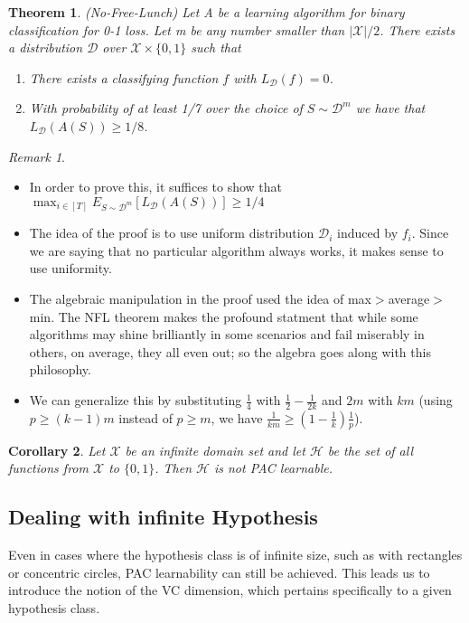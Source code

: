\documentclass{article}
\newtheorem{theorem}{Theorem}
\newtheorem{corollary}[theorem]{Corollary}
\theoremstyle{remark}
\newtheorem{remark}[example]{Remark}
\begin{document}
    \begin{theorem}
    (No-Free-Lunch) Let A be a learning algorithm for binary classification for 0-1 loss. Let m be any number smaller than $\lvert\mathcal{X}\vert/2$. There exists 
    a distribution $\mathcal{D}$ over $\mathcal{X}\times\{0,1\}$ such that 
    \begin{enumerate}
    \item There exists a classifying function $f$ with $L_\mathcal{D}(f)=0$.
    \item With probability of at least 1/7 over the choice of $S\sim \mathcal{D}^m$ we have that $L_{\mathcal{D}}(A(S))\geq 1/8$.
    \end{enumerate}
    \end{theorem}
    \begin{remark}
    \begin{itemize}
    \item In order to prove this, it suffices to show that $\max_{i\in[T]} E_{S\sim\mathcal{D}^m}[L_\mathcal{D}(A(S))]\geq 1/4$
    \item The idea of the proof is to use uniform distribution $\mathcal{D}_i$ induced by $f_i$. Since we are saying that no particular algorithm always works, it makes sense to use uniformity.
    \item The algebraic manipulation in the proof used the idea of max$>$average$>$min. The NFL theorem makes the profound
     statment that while some algorithms may shine brilliantly in some scenarios and fail miserably in others, on average, they all even out; so the 
     algebra goes along with this philosophy.
     \item We can generalize this by substituting $\frac 14$ with $\frac 12-\frac 1{2k}$ and $2m$ with $km$ (using $p\geq (k-1)m$ instead of $p\geq m$, we have $\frac 1{km}\geq (1-\frac 1k)\frac 1p$).
    \end{itemize}
    \end{remark}
    \begin{corollary}
    Let $\mathcal{X}$ be an infinite domain set and let $\mathcal{H}$ be the set of all functions from $\mathcal{X}$ to $\{0,1\}$. Then $\mathcal{H}$ is not PAC learnable.
    \end{corollary}
    \subsection*{Dealing with infinite Hypothesis}
    Even in cases where the hypothesis class is of infinite size, such as with rectangles or concentric circles, PAC learnability can still be achieved. This leads 
    us to introduce the notion of the VC dimension, which pertains specifically to a given hypothesis class.
\end{document}
